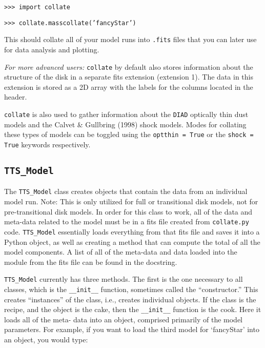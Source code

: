 \documentclass{article}
\begin{document}
\vspace{2mm}
\texttt{>>> import collate}

\texttt{>>> collate.masscollate('fancyStar')}
\vspace{2mm}

\noindent This should collate all of your model runs into \texttt{.fits} files that you can later use for data analysis and plotting. 

\textit{For more advanced users:} \texttt{collate} by default also stores information about the structure of the disk in a separate fits extension (extension 1). The data in this extension is stored as a 2D array with the labels for the columns located in the header. 

\texttt{collate} is also used to gather information about the \texttt{DIAD} optically thin dust models and the Calvet \& Gullbring (1998) shock models. Modes for collating these types of models can be toggled using the \texttt{optthin = True} or the \texttt{shock = True} keywords respectively.

 
\subsection {\texttt{TTS\_Model}}

The \texttt{TTS\_Model} class creates objects that contain the data from an individual model run. Note: This is only utilized for full or transitional disk models, not for pre-transitional disk models. In order for this class to work, all of the data and meta-data related to the model must be in a fits file created from \texttt{collate.py} code. \texttt{TTS\_Model} essentially loads everything from that fits file and saves it into a Python object, as well as creating a method that can compute the total of all the model components. A list of all of the meta-data and data loaded into the module from the fits file can be found in the docstring. 
 
\texttt{TTS\_Model} currently has three methods. The first is the one necessary to all classes, which is the \texttt{\_\_init\_\_} function, sometimes called the “constructor.” This creates “instances” of the class, i.e., creates individual objects. If the class is the recipe, and the object is the cake, then the \texttt{\_\_init\_\_} function is the cook. Here it loads all of the meta- data into an object, comprised primarily of the model parameters. For example, if you want to load the third model for `fancyStar' into an object, you would type: 
 
\end{document}
